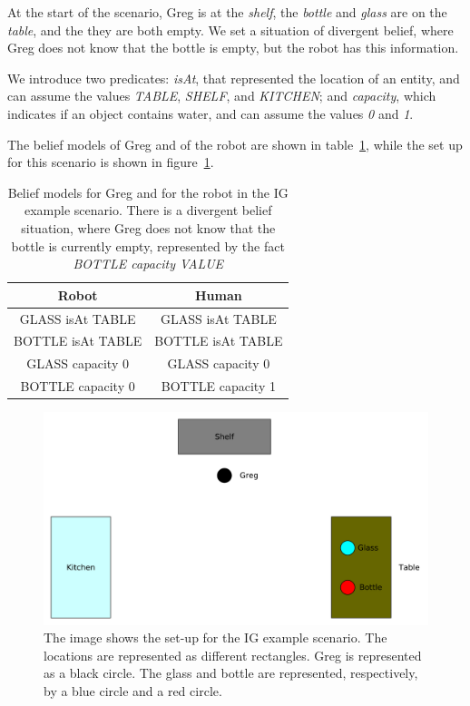 At the start of the scenario, Greg is at the \textit{shelf}, the \textit{bottle} and \textit{glass} are on the \textit{table}, and the they are both empty.  We set a situation of divergent belief, where Greg does not know that the bottle is empty, but the robot has this information. 

We introduce two predicates: \textit{isAt}, that represented the location of an entity, and can assume the values \textit{TABLE}, \textit{SHELF}, and \textit{KITCHEN}; and \textit{capacity}, which indicates if an object contains water, and can assume the values \textit{0} and \textit{1}. 

The belief models of Greg and of the robot are shown in table~\ref{table:intention-ig_bm}, while the set up for this scenario is shown in figure~\ref{fig:intention-ig_scenario}.

 \begin{table}[h!]
\centering
\scriptsize
\renewcommand{\arraystretch}{1.3}
\begin{tabular}{|c|c|}
\hline
Robot & Human \\ \hline \hline
GLASS isAt TABLE  & GLASS isAt TABLE \\ \hline
BOTTLE isAt TABLE & BOTTLE isAt TABLE \\ \hline
GLASS capacity 0  & GLASS capacity 0  \\ \hline
BOTTLE capacity 0 & BOTTLE capacity 1 \\ 
\hline
\end{tabular}
\caption[Belief models in the IG scenario]{Belief models for Greg and for the robot in the IG example scenario. There is a divergent belief situation, where Greg does not know that the bottle is currently empty, represented by the fact \textit{BOTTLE capacity VALUE} }
 \label{table:intention-ig_bm}    
\end{table}



 \begin{figure}[ht!]
	\includegraphics[scale=0.5]{img/observer/ig_scenario.pdf}
	\caption[IG Example Scenario]{The image shows the set-up for the IG example scenario. The locations are represented as different rectangles. Greg is represented as a black circle. The glass and bottle are represented, respectively, by a blue circle and a red circle.}
	\label{fig:intention-ig_scenario}
\end{figure}

